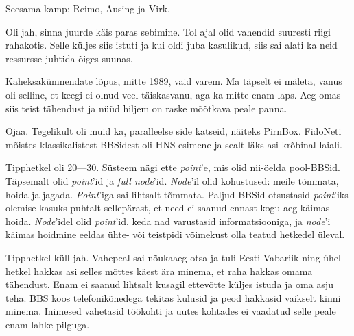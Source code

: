 Seesama kamp: Reimo, Ausing 
 ja Virk.
 

Oli jah, sinna juurde käis paras sebimine. Tol ajal olid vahendid suuresti riigi rahakotis. Selle küljes siis 
istuti ja kui oldi juba kasulikud, siis sai alati ka neid ressursse juhtida õiges suunas. 


Kaheksakümnendate lõpus, mitte 1989, vaid varem. Ma täpselt ei mäleta, 
vanus oli selline, et keegi ei olnud veel täiskasvanu, aga ka mitte enam laps. Aeg omas siis teist tähendust ja nüüd hiljem on
raske mõõtkava peale panna.


Ojaa. Tegelikult oli muid ka, paralleelse side katseid, näiteks 
PirnBox. FidoNeti mõistes klassikalistest BBSidest oli HNS esimene ja sealt läks 
asi krõbinal laiali.


Tipphetkel oli 20---30. Süsteem nägi ette \emph{point}'e, mis olid nii-öelda pool-BBSid. Täpsemalt olid \emph{point}'id ja \emph{full 
node}'id. \emph{Node}'il olid kohustused: meile tõmmata, hoida ja 
jagada. \emph{Point}'iga sai lihtsalt tõmmata. Paljud 
BBSid otsustasid \emph{point}'iks olemise kasuks puhtalt sellepärast, et need 
ei saanud ennast kogu aeg käimas hoida. \emph{Node}'idel olid \emph{point}'id, keda nad varustasid 
informatsiooniga, ja \emph{node}'i käimas hoidmine eeldas ühte- või teistpidi 
võimekust olla teatud hetkedel üleval.


Tipphetkel küll jah. Vahepeal sai nõukaaeg otsa ja tuli Eesti Vabariik ning ühel 
hetkel hakkas asi selles mõttes käest ära minema, et raha hakkas omama 
tähendust. Enam ei saanud lihtsalt kusagil ettevõtte küljes istuda ja oma
asju teha. BBS koos telefonikõnedega tekitas kulusid ja peod
hakkasid vaikselt kinni minema. Inimesed vahetasid töökohti ja uutes 
kohtades ei vaadatud selle peale enam lahke pilguga.

